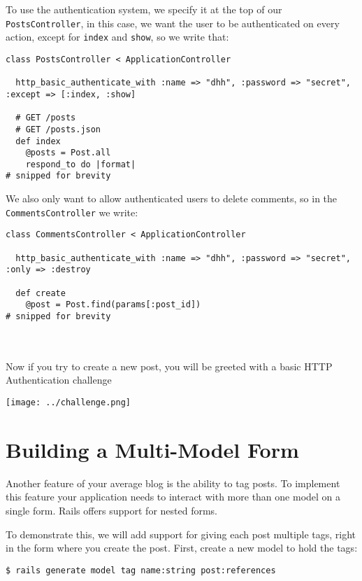 \documentclass[10pt]{book}
\begin{document}
To use the authentication system, we specify it at the top of our \texttt{PostsController}, in this case, we want the user to be authenticated on every action, except for \texttt{index} and \texttt{show}, so we write that:


\begin{verbatim}
class PostsController < ApplicationController
 
  http_basic_authenticate_with :name => "dhh", :password => "secret", :except => [:index, :show]
 
  # GET /posts
  # GET /posts.json
  def index
    @posts = Post.all
    respond_to do |format|
# snipped for brevity
\end{verbatim}

We also only want to allow authenticated users to delete comments, so in the \texttt{CommentsController} we write:

\begin{minipage}{\textwidth}
\begin{verbatim}
class CommentsController < ApplicationController
 
  http_basic_authenticate_with :name => "dhh", :password => "secret", :only => :destroy
 
  def create
    @post = Post.find(params[:post_id])
# snipped for brevity
\end{verbatim}
\end{minipage}
\\ \\

Now if you try to create a new post, you will be greeted with a basic HTTP Authentication challenge


\texttt{[image: ../challenge.png]}

\section{ Building a Multi-Model Form}

Another feature of your average blog is the ability to tag posts. To implement this feature your application needs to interact with more than one model on a single form. Rails offers support for nested forms.

To demonstrate this, we will add support for giving each post multiple tags, right in the form where you create the post. First, create a new model to hold the tags:


\begin{verbatim}
$ rails generate model tag name:string post:references
\end{verbatim}
\end{document}
